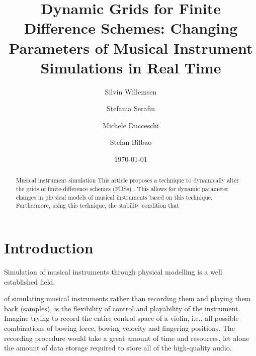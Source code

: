 \documentclass[reprint]{JASA}
\begin{document}
\title[JASA/Sample JASA Article]{Dynamic Grids for Finite Difference Schemes: Changing Parameters of Musical Instrument Simulations in Real Time}
\author{Silvin Willemsen}
\author{Stefania Serafin}

\author{Michele Ducceschi}
\author{Stefan Bilbao}
 



\date{\today} 

\begin{abstract}
Musical instrument simulation
This article proposes a technique to dynamically alter the grids of finite-difference schemes (FDSs) . This allows for dynamic parameter changes in physical models of musical instruments based on this technique. Furthermore, using this technique, the stability condition that 
\end{abstract}


\maketitle




\section{\label{sec:1} Introduction}
Simulation of musical instruments through physical modelling is a well established field.

of simulating musical instruments rather than recording them and playing them back (samples), is the flexibility of control and playability of the instrument. Imagine trying to record the entire control space of a violin, i.e., all possible combinations of bowing force, bowing velocity and fingering positions. The recording procedure would take a great amount of time and resources, let alone the amount of data storage required to store all of the high-quality audio.
\end{document}

